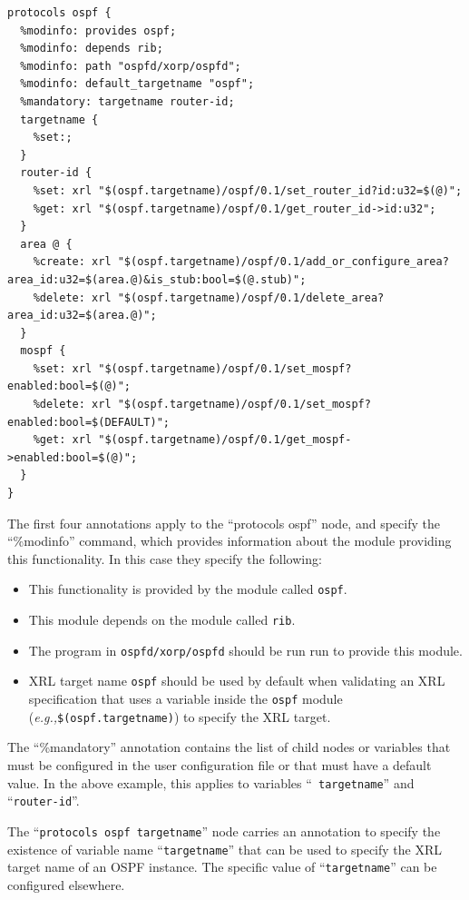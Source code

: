 \documentclass[11pt]{article}
\newcommand{\eg}{\emph{e.g.,}\xspace}
\begin{document}
\begin{verbatim}
protocols ospf {
  %modinfo: provides ospf;
  %modinfo: depends rib;
  %modinfo: path "ospfd/xorp/ospfd";
  %modinfo: default_targetname "ospf";
  %mandatory: targetname router-id;
  targetname {
    %set:;
  }
  router-id {
    %set: xrl "$(ospf.targetname)/ospf/0.1/set_router_id?id:u32=$(@)";
    %get: xrl "$(ospf.targetname)/ospf/0.1/get_router_id->id:u32";
  }
  area @ {
    %create: xrl "$(ospf.targetname)/ospf/0.1/add_or_configure_area?area_id:u32=$(area.@)&is_stub:bool=$(@.stub)";
    %delete: xrl "$(ospf.targetname)/ospf/0.1/delete_area?area_id:u32=$(area.@)";
  }
  mospf {
    %set: xrl "$(ospf.targetname)/ospf/0.1/set_mospf?enabled:bool=$(@)";
    %delete: xrl "$(ospf.targetname)/ospf/0.1/set_mospf?enabled:bool=$(DEFAULT)";
    %get: xrl "$(ospf.targetname)/ospf/0.1/get_mospf->enabled:bool=$(@)";
  }
}
\end{verbatim}

The first four annotations apply to the ``protocols ospf'' node, and
specify the ``\%modinfo'' command, which provides information about
the module providing this functionality.  In this case they specify
the following:

\begin{itemize}

  \item This functionality is provided by the module called {\tt ospf}.

  \item This module depends on the module called {\tt rib}.

  \item The program in {\tt ospfd/xorp/ospfd} should be run run to
        provide this module.

  \item XRL target name {\tt ospf} should be used by default when validating
    an XRL specification that uses a variable inside the {\tt ospf} module
    (\eg {\tt \$(ospf.targetname)}) to specify the XRL target.

\end{itemize}

The ``\%mandatory'' annotation contains the list of child nodes or variables
that must be configured in the user configuration file or that must
have a default value. In the above example, this applies to variables ``{\tt
  targetname}'' and ``{\tt router-id}''.

The ``{\tt protocols ospf targetname}'' node carries an annotation to
specify the existence of variable name ``{\tt targetname}'' that
can be used to specify the XRL target name of an OSPF instance.
The specific value of ``{\tt targetname}'' can be configured elsewhere.
\end{document}
